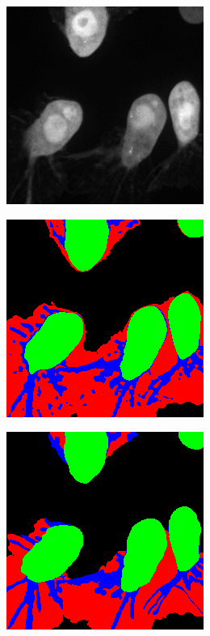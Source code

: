 \begin {figure}[!htb]
\begin {subfigure}[b]{0.25\linewidth}
	\end {subfigure}
	\par\bigskip\par\bigskip
	\begin {subfigure}[b]{0.25\linewidth}
		\includegraphics[scale=0.45]{img/fig_quali_tile3.png}
	\end {subfigure}\hspace{0.5cm}
	\begin {subfigure}[b]{0.25\linewidth}
		\includegraphics[scale=0.45]{img/fig_quali_tile3_pred_c4.png}
	\end {subfigure}\hspace{0.5cm}
	\begin {subfigure}[b]{0.25\linewidth}
		\includegraphics[scale=0.45]{img/fig_quali_tile3_pred_c4_GT.png}

\end{subfigure}
\end{figure}
